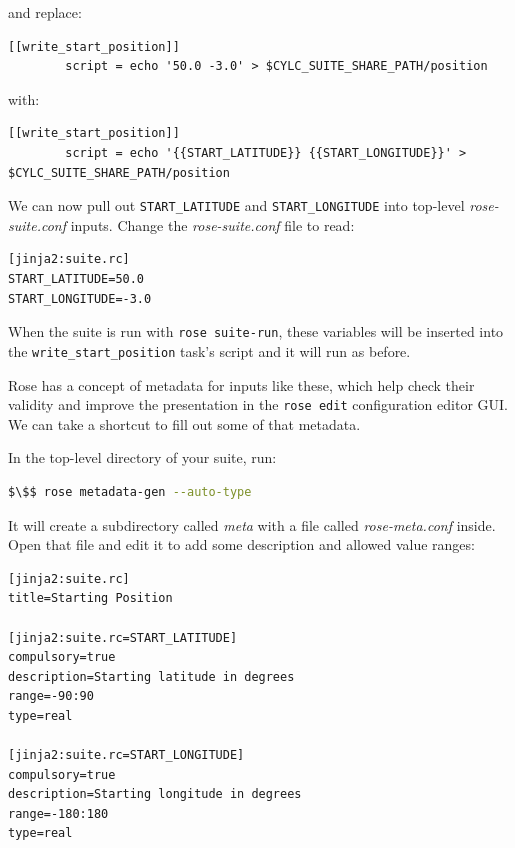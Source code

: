 and replace:

\lstset{language=suiterc}
\begin{lstlisting}[columns=fullflexible]
    [[write_start_position]]
        script = echo '50.0 -3.0' > $CYLC_SUITE_SHARE_PATH/position
\end{lstlisting}

with:

\lstset{language=suiterc}
\begin{lstlisting}[columns=fullflexible]
    [[write_start_position]]
        script = echo '{{START_LATITUDE}} {{START_LONGITUDE}}' > $CYLC_SUITE_SHARE_PATH/position
\end{lstlisting}

We can now pull out \lstinline{START_LATITUDE} and \lstinline{START_LONGITUDE} into top-level {\em rose-suite.conf} inputs. Change the {\em rose-suite.conf} file to read:

\lstset{language=suiterc}
\begin{lstlisting}[columns=fullflexible]
[jinja2:suite.rc]
START_LATITUDE=50.0
START_LONGITUDE=-3.0
\end{lstlisting}

When the suite is run with \lstinline{rose suite-run}, these variables will be inserted into the \lstinline{write_start_position} task's script and it will run as before.

Rose has a concept of metadata for inputs like these, which help check their validity and improve the presentation in the \lstinline{rose edit} configuration editor GUI. We can take a shortcut to fill out some of that metadata.

In the top-level directory of your suite, run:

\begin{lstlisting}[mathescape, language=bash]
$\$$ rose metadata-gen --auto-type
\end{lstlisting}

It will create a subdirectory called {\em meta} with a file called {\em rose-meta.conf} inside. Open that file and edit it to add some description and allowed value ranges:

\lstset{language=suiterc}
\begin{lstlisting}[columns=fullflexible]
[jinja2:suite.rc]
title=Starting Position

[jinja2:suite.rc=START_LATITUDE]
compulsory=true
description=Starting latitude in degrees
range=-90:90
type=real

[jinja2:suite.rc=START_LONGITUDE]
compulsory=true
description=Starting longitude in degrees
range=-180:180
type=real
\end{lstlisting}
 
